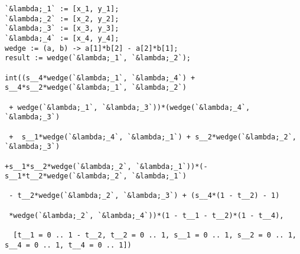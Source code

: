 \documentclass[11pt]{amsart}
\theoremstyle{definition}
\theoremstyle{remark}
\numberwithin{equation}{section}
\begin{document}
\iffalse
\begin{lstlisting}
`&lambda;_1` := [x_1, y_1];
`&lambda;_2` := [x_2, y_2];
`&lambda;_3` := [x_3, y_3];
`&lambda;_4` := [x_4, y_4];
wedge := (a, b) -> a[1]*b[2] - a[2]*b[1];
result := wedge(`&lambda;_1`, `&lambda;_2`);

int((s__4*wedge(`&lambda;_1`, `&lambda;_4`) + s__4*s__2*wedge(`&lambda;_1`, `&lambda;_2`)

 + wedge(`&lambda;_1`, `&lambda;_3`))*(wedge(`&lambda;_4`, `&lambda;_3`)

 +  s__1*wedge(`&lambda;_4`, `&lambda;_1`) + s__2*wedge(`&lambda;_2`, `&lambda;_3`)

+s__1*s__2*wedge(`&lambda;_2`, `&lambda;_1`))*(-s__1*t__2*wedge(`&lambda;_2`, `&lambda;_1`)

 - t__2*wedge(`&lambda;_2`, `&lambda;_3`) + (s__4*(1 - t__2) - 1)

 *wedge(`&lambda;_2`, `&lambda;_4`))*(1 - t__1 - t__2)*(1 - t__4),

  [t__1 = 0 .. 1 - t__2, t__2 = 0 .. 1, s__1 = 0 .. 1, s__2 = 0 .. 1, s__4 = 0 .. 1, t__4 = 0 .. 1])


\end{lstlisting}
\end{document}
